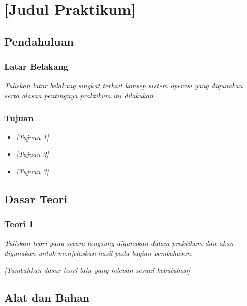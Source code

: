 
\chapter{[Judul Praktikum]}
\label{chap:handson-x}

\section{Pendahuluan}
\label{sec:pendahuluan}

\subsection{Latar Belakang}
\label{subsec:latar-belakang}
\noindent
\textit{
Tuliskan latar belakang singkat terkait konsep sistem operasi yang digunakan
serta alasan pentingnya praktikum ini dilakukan.
}

\subsection{Tujuan}
\label{subsec:tujuan}
\begin{itemize}
    \item \textit{[Tujuan 1]}
    \item \textit{[Tujuan 2]}
    \item \textit{[Tujuan 3]}
\end{itemize}

\section{Dasar Teori}
\label{sec:dasar-teori}

\subsection{Teori 1}
\label{subsec:teori-1}
\noindent
\textit{
Tuliskan teori yang secara langsung digunakan dalam praktikum dan akan digunakan
untuk menjelaskan hasil pada bagian pembahasan.
}

\textit{[Tambahkan dasar teori lain yang relevan sesuai kebutuhan]}

\section{Alat dan Bahan}
\label{sec:alat-bahan}

